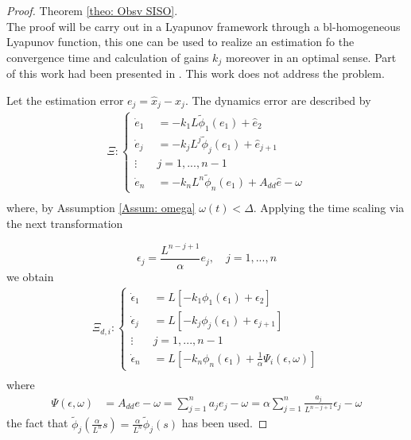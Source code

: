 \documentclass[11pt,letterpaper,twoside,openright]{report}
\begin{document}
\begin{proof}{Theorem \ref{theo: Obsv SISO}. \\}
	The proof will be carry out in a Lyapunov framework through a bl-homogeneous Lyapunov function, this one can be used to realize an estimation fo the convergence time and calculation of gains $k_j$ moreover in an optimal sense. Part of this work had been presented in \cite{Moreno2021}. This work does not address the problem.
	
	Let the estimation error $e_j = \hat{x}_j - x_j$. The dynamics error are described by
	\begin{equation}\label{ecu: Error SISO 1}
		\begin{split}
			\Xi: \left\{
			\begin{array}{rl}
				\dot{e}_{1} &= -k_{1}L \tilde{\phi}_{1}( e_1 ) + \hat{e}_2 \\
				\dot{e}_{j} &= -k_{j}L^{j}\tilde{\phi}_{j}( e_1 ) + \hat{e}_{j+1} \\
				\vdots \quad & j=1,...,n-1\\
				\dot{e}_{n} &= -k_{n}L^{n} \tilde{\phi}_{n}( e_1 ) + A_{dd}\hat{e} - \omega
			\end{array}
			\right. \\
		\end{split}
	\end{equation}
	where, by Assumption \ref{Assum: omega} $\omega(t)<\Delta$. Applying the time scaling via the next transformation
	
	\begin{equation}
		\epsilon_{j}=\frac{L^{{n}-j+1}}{\alpha}e_{j},\quad j=1,...,n
	\end{equation}
	we obtain 
	\begin{equation}\label{ecu: Error SISO 2}
		\begin{split}
			\Xi_{d,i}: \left\{
			\begin{array}{rl}
				\dot{\epsilon}_{1} &= L\left[ -k_{1} \phi_{1}( \epsilon_{1} ) + \epsilon_{2} \right] \\
				\dot{\epsilon}_{j} &= L\left[ -k_{j} \phi_{j}( \epsilon_{1} ) + \epsilon_{j+1} \right] \\
				\vdots \quad & j=1,...,n-1\\
				\dot{\epsilon}_{n} &= L\left[ -k_{n} \phi_{n}( \epsilon_{1} ) + \frac{1}{\alpha}\Psi_{i}(\epsilon,\omega) \right]
			\end{array}
			\right. \\
		\end{split}
	\end{equation}
	where
	\begin{equation}\label{ecu: Psi 1}
		\begin{split}
			\Psi(\epsilon,\omega) &= A_{dd}e - \omega = \sum_{j=1}^{n} a_{j}e_{j} - \omega 
			= \alpha \sum_{j=1}^{n} \frac{a_{j}}{L^{n-j+1}} \epsilon_{j} - \omega
		\end{split} 
	\end{equation}
	the fact that $\tilde{\phi}_{j}( \frac{\alpha}{L^n}s ) = \frac{\alpha}{L^n}\tilde{\phi}_{j}(s)$ has been used.
	

\end{proof}
\end{document}
